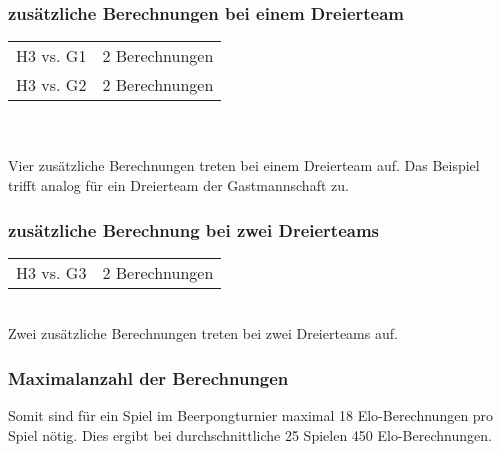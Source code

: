 \documentclass[a4paper, 12pt]{article}
\begin{document}
\subsubsection{zusätzliche Berechnungen bei einem Dreierteam}
\begin{tabular}[h]{ll}
H3 vs. G1 & 2 Berechnungen \\
H3 vs. G2 & 2 Berechnungen \\
\end{tabular}
\\
\\Vier zusätzliche Berechnungen treten bei einem Dreierteam auf. Das Beispiel trifft analog für ein Dreierteam der Gastmannschaft zu.
\subsubsection{zusätzliche Berechnung bei zwei Dreierteams}
\begin{tabular}[h]{ll}
H3 vs. G3 & 2 Berechnungen \\
\end{tabular}
\\Zwei zusätzliche Berechnungen treten bei zwei Dreierteams auf.
\subsubsection{Maximalanzahl der Berechnungen}
Somit sind für ein Spiel im Beerpongturnier maximal 18 Elo-Berechnungen pro Spiel nötig. Dies ergibt bei durchschnittliche 25 Spielen 450 Elo-Berechnungen.
\end{document}
